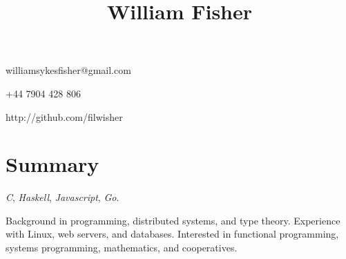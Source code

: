 \documentclass[letterpaper]{article}
\begin{document}
\title{William Fisher}
\author{}

\begin{multicols}{3}
\begin{list1}
  \item \begin{tabular1bold} williamsykesfisher@gmail.com \end{tabular1bold}
  \item \begin{tabular1bold} +44 7904 428 806  \end{tabular1bold}
  \item \begin{tabular1bold} http://github.com/filwisher \end{tabular1bold}
\end{list1}
\end{multicols}

\section*{Summary}
\begin{list1}
  \item \emph{C}, \emph{Haskell}, \emph{Javascript}, \emph{Go}.
  \item Background in programming, distributed systems, and type theory. Experience with Linux, web servers, and databases. Interested in functional programming, systems programming, mathematics, and cooperatives. 
\end{list1}
\end{document}
